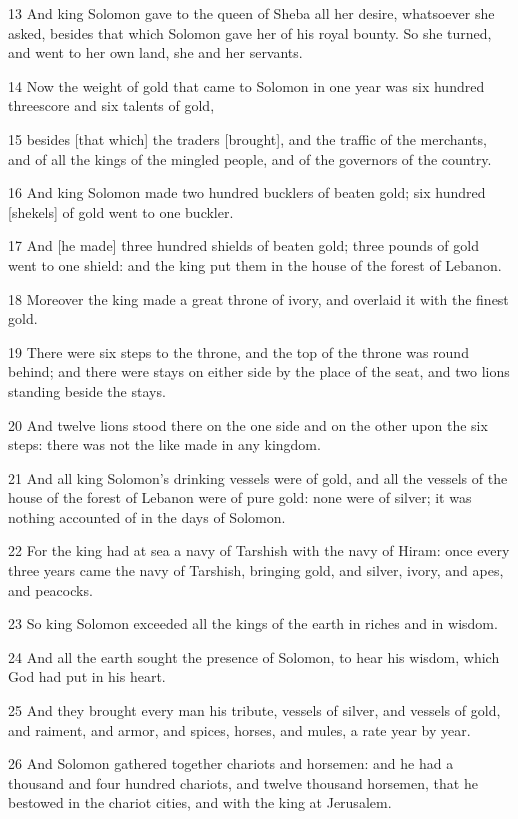 \par 13 And king Solomon gave to the queen of Sheba all her desire, whatsoever she asked, besides that which Solomon gave her of his royal bounty. So she turned, and went to her own land, she and her servants.
\par 14 Now the weight of gold that came to Solomon in one year was six hundred threescore and six talents of gold,
\par 15 besides [that which] the traders [brought], and the traffic of the merchants, and of all the kings of the mingled people, and of the governors of the country.
\par 16 And king Solomon made two hundred bucklers of beaten gold; six hundred [shekels] of gold went to one buckler.
\par 17 And [he made] three hundred shields of beaten gold; three pounds of gold went to one shield: and the king put them in the house of the forest of Lebanon.
\par 18 Moreover the king made a great throne of ivory, and overlaid it with the finest gold.
\par 19 There were six steps to the throne, and the top of the throne was round behind; and there were stays on either side by the place of the seat, and two lions standing beside the stays.
\par 20 And twelve lions stood there on the one side and on the other upon the six steps: there was not the like made in any kingdom.
\par 21 And all king Solomon's drinking vessels were of gold, and all the vessels of the house of the forest of Lebanon were of pure gold: none were of silver; it was nothing accounted of in the days of Solomon.
\par 22 For the king had at sea a navy of Tarshish with the navy of Hiram: once every three years came the navy of Tarshish, bringing gold, and silver, ivory, and apes, and peacocks.
\par 23 So king Solomon exceeded all the kings of the earth in riches and in wisdom.
\par 24 And all the earth sought the presence of Solomon, to hear his wisdom, which God had put in his heart.
\par 25 And they brought every man his tribute, vessels of silver, and vessels of gold, and raiment, and armor, and spices, horses, and mules, a rate year by year.
\par 26 And Solomon gathered together chariots and horsemen: and he had a thousand and four hundred chariots, and twelve thousand horsemen, that he bestowed in the chariot cities, and with the king at Jerusalem.
